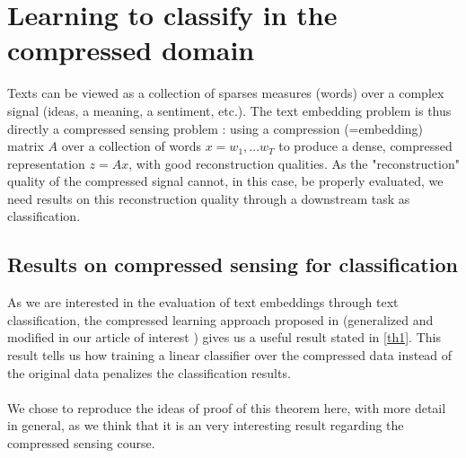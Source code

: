 \documentclass{article}
\begin{document}

\section{Learning to classify in the compressed domain}

Texts can be viewed as a collection of sparses measures (words) 
over a complex signal (ideas, a meaning, a sentiment, etc.). The
text embedding problem is thus directly a compressed sensing problem : 
using a compression (=embedding) matrix $A$ over a collection of 
words $x=w_1, ...w_T$ to produce a dense, compressed representation 
$z = Ax$, with good reconstruction qualities. As the "reconstruction"
quality of the compressed signal cannot, in this case, 
be properly evaluated, we need results on this reconstruction
quality through a downstream task as classification. 

\subsection{Results on compressed sensing for classification}

As we are interested in the evaluation of text embeddings through 
text classification, the compressed learning approach proposed 
in \cite{Calderbank2009CompressedL} (generalized and modified in 
our article of interest \cite{arora2018sensing}) gives us a useful result
stated in \ref{th1}. This result tells us how training a linear 
classifier over the compressed data instead of the original data 
penalizes the classification results. \\ \\We chose to reproduce the
 ideas of proof of this theorem here, with more detail in general, as we think that it is 
an very interesting result regarding the compressed sensing course. 
\end{document}
